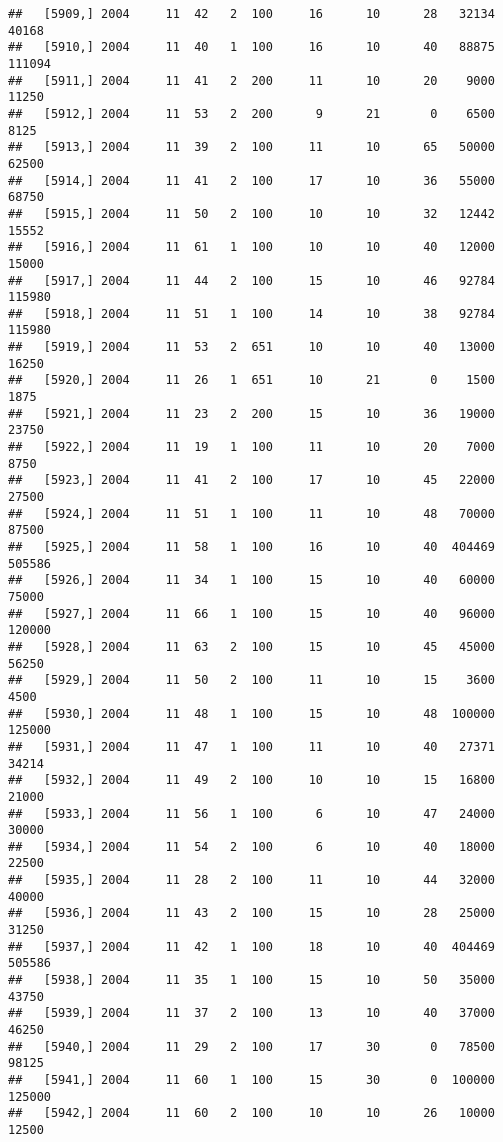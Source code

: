 \documentclass{article}\usepackage[]{graphicx}\usepackage[]{color}
\makeatletter
\newenvironment{kframe}{%
 \def\at@end@of@kframe{}%
 \ifinner\ifhmode%
  \def\at@end@of@kframe{\end{minipage}}%
  \begin{minipage}{\columnwidth}%
 \fi\fi%
 \def\FrameCommand##1{\hskip\@totalleftmargin \hskip-\fboxsep
 \colorbox{shadecolor}{##1}\hskip-\fboxsep
     \hskip-\linewidth \hskip-\@totalleftmargin \hskip\columnwidth}%
 \MakeFramed {\advance\hsize-\width
   \@totalleftmargin\z@ \linewidth\hsize
   \@setminipage}}%
 {\par\unskip\endMakeFramed%
 \at@end@of@kframe}
\newenvironment{knitrout}{}{} %
\makeatother
\begin{document}
\begin{knitrout}
\begin{kframe}
\begin{verbatim}
##   [5909,] 2004     11  42   2  100     16      10      28   32134   40168
##   [5910,] 2004     11  40   1  100     16      10      40   88875  111094
##   [5911,] 2004     11  41   2  200     11      10      20    9000   11250
##   [5912,] 2004     11  53   2  200      9      21       0    6500    8125
##   [5913,] 2004     11  39   2  100     11      10      65   50000   62500
##   [5914,] 2004     11  41   2  100     17      10      36   55000   68750
##   [5915,] 2004     11  50   2  100     10      10      32   12442   15552
##   [5916,] 2004     11  61   1  100     10      10      40   12000   15000
##   [5917,] 2004     11  44   2  100     15      10      46   92784  115980
##   [5918,] 2004     11  51   1  100     14      10      38   92784  115980
##   [5919,] 2004     11  53   2  651     10      10      40   13000   16250
##   [5920,] 2004     11  26   1  651     10      21       0    1500    1875
##   [5921,] 2004     11  23   2  200     15      10      36   19000   23750
##   [5922,] 2004     11  19   1  100     11      10      20    7000    8750
##   [5923,] 2004     11  41   2  100     17      10      45   22000   27500
##   [5924,] 2004     11  51   1  100     11      10      48   70000   87500
##   [5925,] 2004     11  58   1  100     16      10      40  404469  505586
##   [5926,] 2004     11  34   1  100     15      10      40   60000   75000
##   [5927,] 2004     11  66   1  100     15      10      40   96000  120000
##   [5928,] 2004     11  63   2  100     15      10      45   45000   56250
##   [5929,] 2004     11  50   2  100     11      10      15    3600    4500
##   [5930,] 2004     11  48   1  100     15      10      48  100000  125000
##   [5931,] 2004     11  47   1  100     11      10      40   27371   34214
##   [5932,] 2004     11  49   2  100     10      10      15   16800   21000
##   [5933,] 2004     11  56   1  100      6      10      47   24000   30000
##   [5934,] 2004     11  54   2  100      6      10      40   18000   22500
##   [5935,] 2004     11  28   2  100     11      10      44   32000   40000
##   [5936,] 2004     11  43   2  100     15      10      28   25000   31250
##   [5937,] 2004     11  42   1  100     18      10      40  404469  505586
##   [5938,] 2004     11  35   1  100     15      10      50   35000   43750
##   [5939,] 2004     11  37   2  100     13      10      40   37000   46250
##   [5940,] 2004     11  29   2  100     17      30       0   78500   98125
##   [5941,] 2004     11  60   1  100     15      30       0  100000  125000
##   [5942,] 2004     11  60   2  100     10      10      26   10000   12500

\end{verbatim}
\end{kframe}
\end{knitrout}
\end{document}
